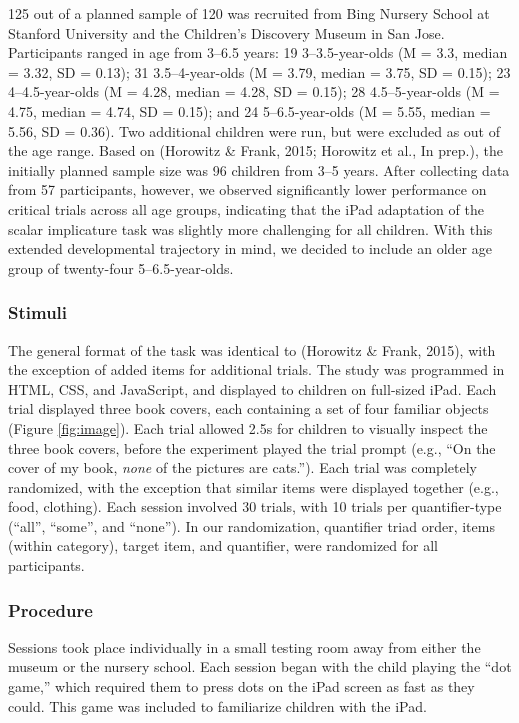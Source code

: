 \documentclass[10pt, letterpaper]{article}
\begin{document}
125 out of a planned sample of 120 was recruited from Bing Nursery
School at Stanford University and the Children's Discovery Museum in San
Jose. Participants ranged in age from 3--6.5 years: 19 3--3.5-year-olds
(M = 3.3, median = 3.32, SD = 0.13); 31 3.5--4-year-olds (M = 3.79,
median = 3.75, SD = 0.15); 23 4--4.5-year-olds (M = 4.28, median = 4.28,
SD = 0.15); 28 4.5--5-year-olds (M = 4.75, median = 4.74, SD = 0.15);
and 24 5--6.5-year-olds (M = 5.55, median = 5.56, SD = 0.36). Two
additional children were run, but were excluded as out of the age range.
Based on (Horowitz \& Frank, 2015; Horowitz et al., In prep.), the
initially planned sample size was 96 children from 3--5 years. After
collecting data from 57 participants, however, we observed significantly
lower performance on critical trials across all age groups, indicating
that the iPad adaptation of the scalar implicature task was slightly
more challenging for all children. With this extended developmental
trajectory in mind, we decided to include an older age group of
twenty-four 5--6.5-year-olds.

\subsubsection{Stimuli}\label{stimuli}

The general format of the task was identical to (Horowitz \& Frank,
2015), with the exception of added items for additional trials. The
study was programmed in HTML, CSS, and JavaScript, and displayed to
children on full-sized iPad. Each trial displayed three book covers,
each containing a set of four familiar objects (Figure \ref{fig:image}).
Each trial allowed 2.5s for children to visually inspect the three book
covers, before the experiment played the trial prompt (e.g., ``On the
cover of my book, \emph{none} of the pictures are cats.''). Each trial
was completely randomized, with the exception that similar items were
displayed together (e.g., food, clothing). Each session involved 30
trials, with 10 trials per quantifier-type (``all'', ``some'', and
``none''). In our randomization, quantifier triad order, items (within
category), target item, and quantifier, were randomized for all
participants.

\subsubsection{Procedure}\label{procedure}

Sessions took place individually in a small testing room away from
either the museum or the nursery school. Each session began with the
child playing the ``dot game,'' which required them to press dots on the
iPad screen as fast as they could. This game was included to familiarize
children with the iPad.
\end{document}
